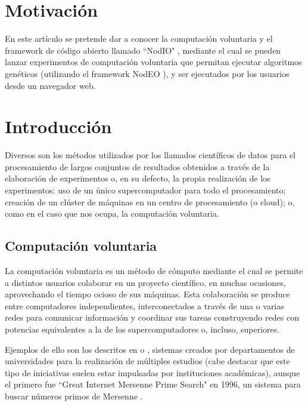\documentclass[runningheads,a4paper]{llncs}
\begin{document}
\section{Motivaci\'on}
En este art\'iculo se pretende dar a conocer la computaci\'on voluntaria y
el framework de c\'odigo abierto llamado ``NodIO" \cite{nodio}, mediante el cual
se pueden lanzar experimentos de computaci\'on voluntaria
que permitan ejecutar algoritmos gen\'eticos (utilizando el framework NodEO \cite{nodeo}),
y ser ejecutados por los usuarios desde un navegador web.


\section{Introducci\'on}
%
Diversos son los m\'etodos utilizados por los llamados cient\'ificos
de datos para el procesamiento de largos conjuntos de resultados obtenidos
a trav\'es de la elaboraci\'on de experimentos o, en su defecto, la propia
realizaci\'on de los experimentos: uso de un \'unico supercomputador para
todo el procesamiento; creaci\'on de un cl\'uster de m\'aquinas en un centro
de procesamiento (o cloud); o, como en el caso que nos ocupa, la computaci\'on voluntaria.

\subsection{Computaci\'on voluntaria}
La computaci\'on voluntaria es un m\'etodo de c\'omputo mediante el cual se
permite a distintos usuarios colaborar en un proyecto cient\'ifico,
en muchas ocasiones, aprovechando el tiempo ocioso de sus m\'aquinas. Esta colaboraci\'on
se produce entre computadores independientes, interconectados a trav\'es de una o varias redes
para comunicar informaci\'on y coordinar sus tareas construyendo redes con potencias
equivalentes a la de los supercomputadores o, incluso, superiores.

Ejemplos de ello son los descritos en \cite{seti} o \cite{climate}, sistemas creados por
departamentos de universidades para la realizaci\'on de m\'ultiples estudios
(cabe destacar que este tipo de iniciativas suelen estar impulsadas por
instituciones acad\'emicas), aunque el primero fue ``Great Internet Mersenne Prime Search" en 1996,
un sistema para buscar n\'umeros primos de Mersenne \cite{gimps}.
\end{document}
